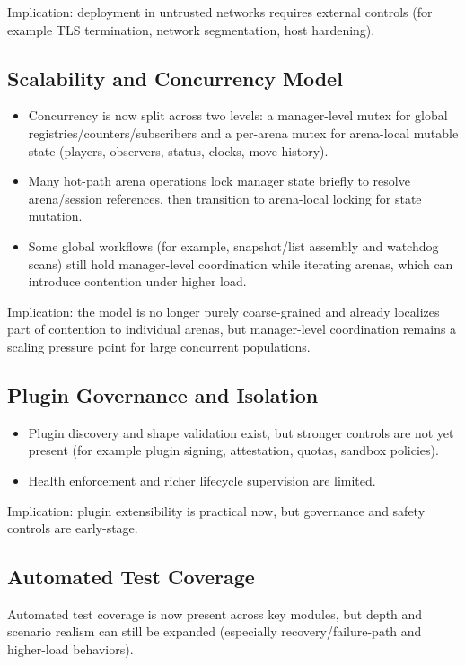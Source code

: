 \documentclass[11pt]{article}
\begin{document}
Implication: deployment in untrusted networks requires external controls (for example TLS termination, network segmentation, host hardening).

\subsection{Scalability and Concurrency Model}
\begin{itemize}[leftmargin=*]
  \item Concurrency is now split across two levels: a manager-level mutex for global registries/counters/subscribers and a per-arena mutex for arena-local mutable state (players, observers, status, clocks, move history).
  \item Many hot-path arena operations lock manager state briefly to resolve arena/session references, then transition to arena-local locking for state mutation.
  \item Some global workflows (for example, snapshot/list assembly and watchdog scans) still hold manager-level coordination while iterating arenas, which can introduce contention under higher load.
\end{itemize}

Implication: the model is no longer purely coarse-grained and already localizes part of contention to individual arenas, but manager-level coordination remains a scaling pressure point for large concurrent populations.

\subsection{Plugin Governance and Isolation}
\begin{itemize}[leftmargin=*]
  \item Plugin discovery and shape validation exist, but stronger controls are not yet present (for example plugin signing, attestation, quotas, sandbox policies).
  \item Health enforcement and richer lifecycle supervision are limited.
\end{itemize}

Implication: plugin extensibility is practical now, but governance and safety controls are early-stage.

\subsection{Automated Test Coverage}
Automated test coverage is now present across key modules, but depth and scenario realism can still be expanded (especially recovery/failure-path and higher-load behaviors).
\end{document}
